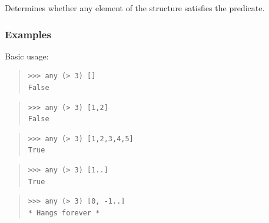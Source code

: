 \begin{haddockdesc}
\item[\begin{tabular}{@{}l}
any :: Foldable t => (a -> Bool) -> t a -> Bool
\end{tabular}]
{\haddockbegindoc
Determines whether any element of the structure satisfies the predicate.\par
\subsubsection*{\textbf{Examples}}
Basic usage:\par
\begin{quote}
{\haddockverb\begin{verbatim}
>>> any (> 3) []
False

\end{verbatim}}
\end{quote}
\begin{quote}
{\haddockverb\begin{verbatim}
>>> any (> 3) [1,2]
False

\end{verbatim}}
\end{quote}
\begin{quote}
{\haddockverb\begin{verbatim}
>>> any (> 3) [1,2,3,4,5]
True

\end{verbatim}}
\end{quote}
\begin{quote}
{\haddockverb\begin{verbatim}
>>> any (> 3) [1..]
True

\end{verbatim}}
\end{quote}
\begin{quote}
{\haddockverb\begin{verbatim}
>>> any (> 3) [0, -1..]
* Hangs forever *

\end{verbatim}}
\end{quote}}
\end{haddockdesc}
